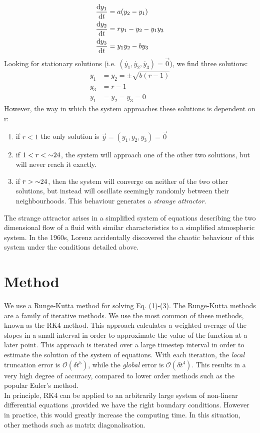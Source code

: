 \documentclass[a4paper,11pt]{article}
\begin{document}
\begin{align}
\frac{\dif y_1}{\dif t} & = a(y_2 - y_1)\\
\frac{\dif y_2}{\dif t} & = ry_1 - y_2 - y_1y_3\\
\frac{\dif y_3}{\dif t} & = y_1y_2 - by_3
\end{align}
Looking for stationary solutions (i.e. $(\dot{y_1},\dot{y_2},\dot{y_3}) = \vec{0}$), we find three solutions:
\begin{align}
y_1 & = y_2  = \pm \sqrt{b(r-1)}\\
y_3 &= r-1\\
y_1 &= y_2 = y_3  = 0
\end{align}
However, the way in which the system approaches these solutions is dependent on r:
\begin{enumerate}
\item if $r < 1$ the only solution is $\vec{y} = (y_1,y_2,y_3) = \vec{0}$
\item if $1<r<\hspace{1mm}\sim\hspace{-1mm}24$, the system will approach one of the other two solutions, but will never reach it exactly.
\item if $r>\hspace{1mm}\sim\hspace{-1mm}24$, then the system will converge on neither of the two other solutions, but instead will oscillate seemingly randomly between their neighbourhoods. This behaviour generates a \textit{strange attractor}. 
\end{enumerate}
The strange attractor arises in a simplified system of equations describing the two dimensional flow of a fluid with similar characteristics to a simplified atmospheric system. In the 1960s, Lorenz accidentally discovered the chaotic behaviour of this system under the conditions detailed above.

\section{Method}
We use a Runge-Kutta method for solving Eq. (1)-(3). The Runge-Kutta methods are a family of iterative methods. We use the most common of these methods, known as the RK4 method\cite{wikirunge}. This approach calculates a weighted average of the slopes in a small interval in order to approximate the value of the function at a later point. This approach is iterated over a large timestep interval in order to estimate the solution of the system of equations. With each iteration, the \textit{local} truncation error is $\mathcal{O}(\delta t^5)$, while the \textit{global} error is $\mathcal{O}(\delta t^4)$\cite{wikirunge}. This results in a very high degree of accuracy, compared to lower order methods such as the popular Euler's method. 
\\
In principle, RK4 can be applied to an arbitrarily large system of non-linear differential equations ,provided we have the right boundary conditions. However in practice, this would greatly increase the computing time. In this situation, other methods such as matrix diagonalisation\cite{matrix}.
\end{document}
